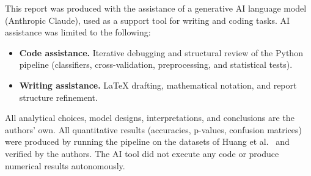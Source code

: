 
This report was produced with the assistance of a generative AI
language model (Anthropic Claude), used as a support tool for
writing and coding tasks. AI assistance was limited to the
following:
\begin{itemize}
  \item \textbf{Code assistance.}
  Iterative debugging and structural review of the Python
  pipeline (classifiers, cross-validation, preprocessing,
  and statistical tests).
  \item \textbf{Writing assistance.}
  LaTeX drafting, mathematical notation, and report
  structure refinement.
\end{itemize}
All analytical choices, model designs, interpretations, and
conclusions are the authors' own. All quantitative results
(accuracies, p-values, confusion matrices) were produced by
running the pipeline on the datasets of
Huang et al.~\cite{Huang2019} and verified by the authors.
The AI tool did not execute any code or produce numerical
results autonomously.